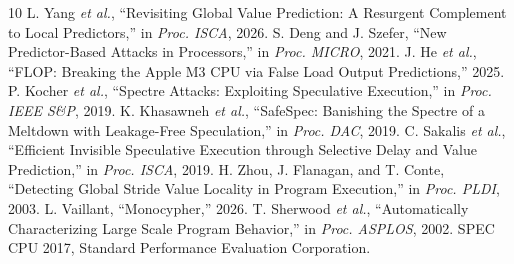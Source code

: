 \documentclass[conference]{IEEEtran}
\begin{document}
\small

\begin{thebibliography}{10}
\setlength{\itemsep}{0pt}
 L. Yang \emph{et al.}, ``Revisiting Global Value
Prediction: A Resurgent Complement to Local Predictors,'' in
\emph{Proc. ISCA}, 2026.
 S. Deng and J. Szefer, ``New Predictor-Based Attacks in
Processors,'' in \emph{Proc. MICRO}, 2021.
 J. He \emph{et al.}, ``FLOP: Breaking the Apple M3 CPU via
False Load Output Predictions,'' 2025.
 P. Kocher \emph{et al.}, ``Spectre Attacks: Exploiting
Speculative Execution,'' in \emph{Proc. IEEE S\&P}, 2019.
 K. Khasawneh \emph{et al.}, ``SafeSpec: Banishing the
Spectre of a Meltdown with Leakage-Free Speculation,'' in \emph{Proc.
DAC}, 2019.
 C. Sakalis \emph{et al.}, ``Efficient Invisible Speculative
Execution through Selective Delay and Value Prediction,'' in
\emph{Proc. ISCA}, 2019.
 H. Zhou, J. Flanagan, and T. Conte, ``Detecting Global
Stride Value Locality in Program Execution,'' in \emph{Proc. PLDI}, 2003.
 L. Vaillant, ``Monocypher,'' 2026.
 T. Sherwood \emph{et al.}, ``Automatically
Characterizing Large Scale Program Behavior,'' in \emph{Proc. ASPLOS},
2002.
 SPEC CPU 2017, Standard Performance Evaluation Corporation.
\end{thebibliography}
\end{document}
